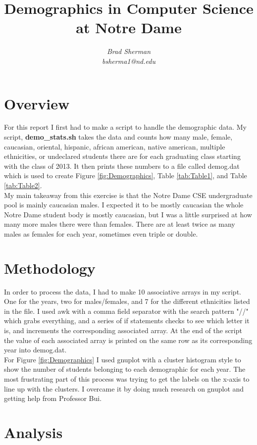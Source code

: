 \documentclass{article}
\title{{\bf Demographics in Computer Science at Notre Dame}}
\author{{\it Brad Sherman} \\ {\it bsherma1@nd.edu} }
\begin{document}
\maketitle

\section*{Overview}

For this report I first had to make a script to handle the demographic
data. My script, {\bf demo\_stats.sh} takes the data and counts how many
male, female, caucasian, oriental, hispanic, african american, native
american, multiple ethnicities, or undeclared students there are for each 
graduating class starting with the class of 2013. It then prints these 
numbers to a file called demog.dat which is used to create Figure 
\ref{fig:Demographics}, Table \ref{tab:Table1}, and Table \ref{tab:Table2}.
\\
My main takeaway from this exercise is that the Notre Dame CSE undergraduate
pool is mainly caucasian males. I expected it to be mostly caucasian 
the whole Notre Dame student body is mostly caucasian, but I was a little
surprised at how many more males there were than females. There are at 
least twice as many males as females for each year, sometimes even triple
or double. 

\section*{Methodology}

In order to process the data, I had to make 10 associative arrays in my 
script. One for the years, two for males/females, and 7 for the different
ethnicities listed in the file. I used awk with a comma field separator
with the search pattern "//" which grabs everything, and a series of if
statements checks to see which letter it is, and increments the corresponding
associated array. At the end of the script the value of each associated
array is printed on the same row as its corresponding year into demog.dat.
\\
For Figure \ref{fig:Demographics} I used gnuplot with a cluster histogram style to show the
number of students belonging to each demographic for each year. The most
frustrating part of this process was trying to get the labels on the x-axis
to line up with the clusters. I overcame it by doing much research on gnuplot
and getting help from Professor Bui. 

\section*{Analysis}
\end{document}
